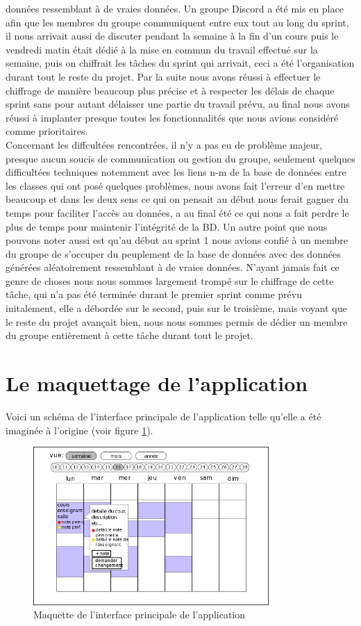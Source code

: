 \documentclass[a4paper,12pt]{article}
\begin{document}
données ressemblant à de vraies données. Un groupe Discord a été mis en place afin que les membres du groupe communiquent entre eux tout au long du sprint, il nous arrivait aussi de discuter pendant la semaine à la fin d'un cours
puis le vendredi matin était dédié à la mise en commun du travail effectué sur la semaine, puis on chiffrait les tâches du sprint qui arrivait, ceci a été l'organisation durant tout le reste du projet.
Par la suite nous avons réussi à effectuer le chiffrage de manière beaucoup plus précise et à respecter les délais de chaque sprint sans pour autant délaisser une partie du travail prévu, 
au final nous avons réussi à implanter presque toutes les fonctionnalités que nous avions considéré comme prioritaires.\\
Concernant les diffcultées rencontrées, il n'y a pas eu de problème majeur, presque aucun soucis de communication ou gestion du groupe, seulement quelques difficultées techniques notemment avec les 
liens n-m de la base de données entre les classes qui ont posé quelques problèmes, nous avons fait l'erreur d'en mettre beaucoup et dans les deux sens ce qui on pensait au début nous ferait gagner du temps pour
faciliter l'accès au données, a au final été ce qui nous a fait perdre le plus de temps pour maintenir l'intégrité de la BD. Un autre point que nous pouvons noter aussi
est qu'au début au sprint 1 nous avions confié à un membre du groupe de s'occuper du peuplement de la base de données avec des données générées aléatoirement ressemblant à de vraies données. N'ayant jamais fait
ce genre de choses nous nous sommes largement trompé sur le chiffrage de cette tâche, qui n'a pas été terminée durant le premier sprint comme prévu initalement, elle a débordée sur le second, puis sur le troisième,
mais voyant que le reste du projet avançait bien, nous nous sommes permis de dédier un membre du groupe entièrement à cette tâche durant tout le projet.\\

\section{Le maquettage de l’application}
Voici un schéma de l'interface principale de l'application telle qu'elle a été imaginée à l'origine (voir figure \ref{fig:maquette}).
\begin{figure}[h]
    \centering
    \includegraphics[width=0.8\textwidth]{gui-schema.png}
    \caption{Maquette de l'interface principale de l'application}
    \label{fig:maquette}
\end{figure}
\end{document}
